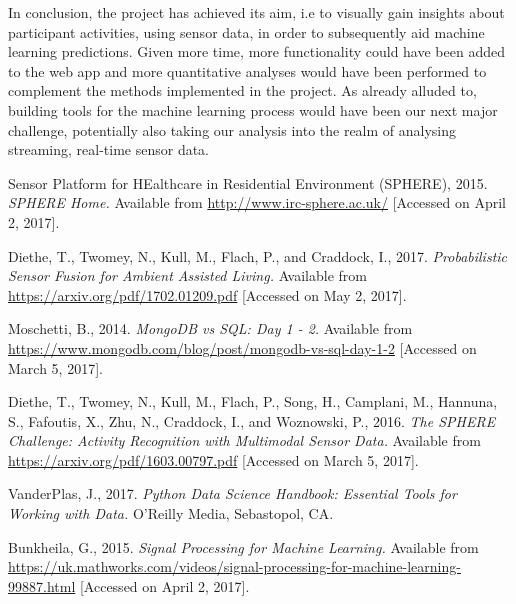\documentclass[fleqn,10pt]{SelfArx} %
\begin{document}
In conclusion, the project has achieved its aim, i.e to visually gain insights about participant activities, using sensor data, in order to subsequently aid machine learning predictions. Given more time, more functionality could have been added to the web app and more quantitative analyses would have been performed to complement the methods implemented in the project. As already alluded to, building tools for the machine learning process would have been our next major challenge, potentially also taking our analysis into the realm of analysing streaming, real-time sensor data.  \\


\begin{thebibliography}{}

Sensor Platform for HEalthcare in Residential Environment (SPHERE), 2015. \textit{SPHERE Home.} Available from \url{http://www.irc-sphere.ac.uk/} [Accessed on April 2, 2017].

Diethe, T., Twomey, N., Kull, M., Flach, P., and Craddock, I., 2017. \textit{Probabilistic Sensor Fusion for Ambient Assisted Living.} Available from \url{https://arxiv.org/pdf/1702.01209.pdf} [Accessed on May 2, 2017].

Moschetti, B., 2014. \textit{MongoDB vs SQL: Day 1 - 2.} Available from \url{https://www.mongodb.com/blog/post/mongodb-vs-sql-day-1-2} [Accessed on March 5, 2017].

Diethe, T., Twomey, N., Kull, M., Flach, P., Song, H., Camplani, M., Hannuna, S., Fafoutis, X., Zhu, N., Craddock, I., and Woznowski, P., 2016. \textit{The SPHERE Challenge: Activity Recognition with Multimodal Sensor Data.} Available from \url{https://arxiv.org/pdf/1603.00797.pdf} [Accessed on March 5, 2017].

VanderPlas, J., 2017. \textit{Python Data Science Handbook: Essential Tools for Working with Data.} O'Reilly Media, Sebastopol, CA.

Bunkheila, G., 2015. \textit{Signal Processing for Machine Learning.} Available from \url{https://uk.mathworks.com/videos/signal-processing-for-machine-learning-99887.html} [Accessed on April 2, 2017].

\end{thebibliography}

\end{document}
